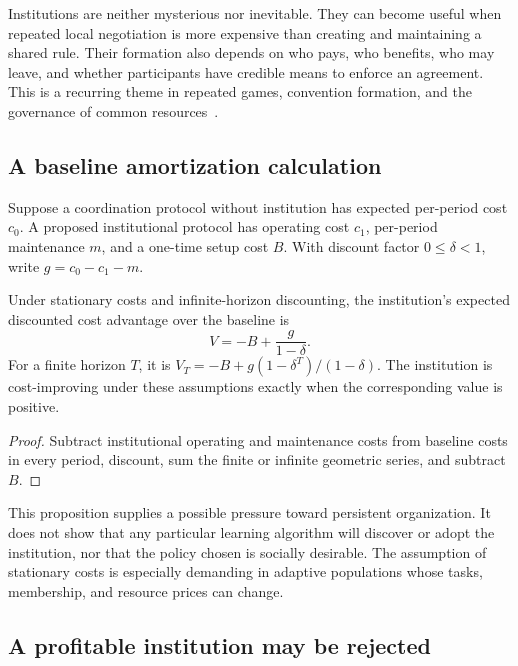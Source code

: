 Institutions are neither mysterious nor inevitable. They can become useful when repeated local negotiation is more expensive than creating and maintaining a shared rule. Their formation also depends on who pays, who benefits, who may leave, and whether participants have credible means to enforce an agreement. This is a recurring theme in repeated games, convention formation, and the governance of common resources~\cite{MS:fudenbergmaskin,MS:shoham,MS:ostrombook}.

\subsection{A baseline amortization calculation}

Suppose a coordination protocol without institution has expected per-period cost $c_0$. A proposed institutional protocol has operating cost $c_1$, per-period maintenance $m$, and a one-time setup cost $B$. With discount factor $0\le\delta<1$, write $g=c_0-c_1-m$.

\begin{MSproposition}\label{MS:prop:amort}
Under stationary costs and infinite-horizon discounting, the institution's expected discounted cost advantage over the baseline is
\begin{equation}\label{MS:eq:amort}
V=-B+\frac{g}{1-\delta}.
\end{equation}
For a finite horizon $T$, it is $V_T=-B+g(1-\delta^T)/(1-\delta)$. The institution is cost-improving under these assumptions exactly when the corresponding value is positive.
\end{MSproposition}
\begin{proof}
Subtract institutional operating and maintenance costs from baseline costs in every period, discount, sum the finite or infinite geometric series, and subtract $B$.
\end{proof}

This proposition supplies a possible pressure toward persistent organization. It does not show that any particular learning algorithm will discover or adopt the institution, nor that the policy chosen is socially desirable. The assumption of stationary costs is especially demanding in adaptive populations whose tasks, membership, and resource prices can change.

\subsection{A profitable institution may be rejected}

